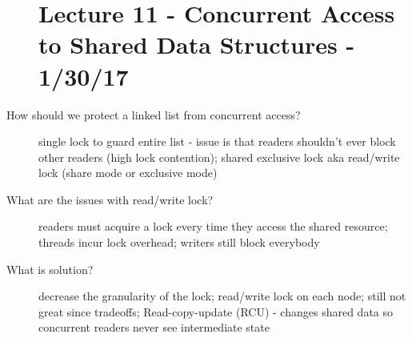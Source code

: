 \documentclass[10pt]{article}
\begin{document}
\begin{description}
\section{Lecture 11 - Concurrent Access to Shared Data Structures - 1/30/17}
\item[How should we protect a linked list from concurrent access?]
  single lock to guard entire list - issue is that readers shouldn't ever block other readers (high lock contention);
  shared exclusive lock aka read/write lock (share mode or exclusive mode)
\item[What are the issues with read/write lock?]
  readers must acquire a lock every time they access the shared resource; threads incur lock overhead;
  writers still block everybody
\item[What is solution?]
  decrease the granularity of the lock; read/write lock on each node; still not great since tradeoffs;
  Read-copy-update (RCU) - changes shared data so concurrent readers never see intermediate state
\end{description}
\end{document}
